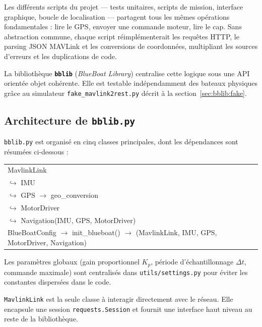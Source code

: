 Les différents scripts du projet — tests unitaires, scripts de mission, interface graphique, boucle de localisation — partagent tous les mêmes opérations fondamentales : lire le GPS, envoyer une commande moteur, lire le cap. Sans abstraction commune, chaque script réimplémenterait les requêtes HTTP, le parsing JSON MAVLink et les conversions de coordonnées, multipliant les sources d'erreurs et les duplications de code.

La bibliothèque \textbf{\texttt{bblib}} (\textit{BlueBoat Library}) centralise cette logique sous une API orientée objet cohérente. Elle est testable indépendamment des bateaux physiques grâce au simulateur \texttt{fake\_mavlink2rest.py} décrit à la section~\ref{sec:bblib:fake}.

\subsection{Architecture de \texttt{bblib.py}}
\label{sec:bblib:arch}

\texttt{bblib.py} est organisé en cinq classes principales, dont les dépendances sont résumées ci-dessous :

\begin{center}
\ttfamily
\begin{tabular}{l}
MavlinkLink \\
\quad $\hookrightarrow$ IMU \\
\quad $\hookrightarrow$ GPS $\longrightarrow$ geo\_conversion \\
\quad $\hookrightarrow$ MotorDriver \\
\quad $\hookrightarrow$ Navigation(IMU, GPS, MotorDriver) \\[4pt]
BlueBoatConfig $\longrightarrow$ init\_blueboat() $\longrightarrow$ (MavlinkLink, IMU, GPS, MotorDriver, Navigation)
\end{tabular}
\end{center}

\noindent Les paramètres globaux (gain proportionnel $K_p$, période d'échantillonnage $\Delta t$, commande maximale) sont centralisés dans \texttt{utils/settings.py} pour éviter les constantes dispersées dans le code.

\label{sec:bblib:mavlinklink}
\texttt{MavlinkLink} est la seule classe à interagir directement avec le réseau. Elle encapsule une session \texttt{requests.Session} et fournit une interface haut niveau au reste de la bibliothèque.

